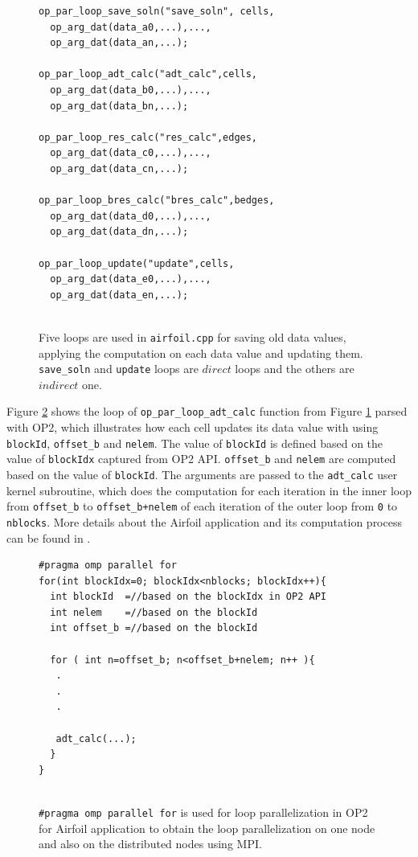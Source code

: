 \documentclass[conference]{IEEEtran}
\begin{document}
\begin{figure} [!h]
    \begin{lstlisting}
op_par_loop_save_soln("save_soln", cells,
  op_arg_dat(data_a0,...),...,
  op_arg_dat(data_an,...);
  
op_par_loop_adt_calc("adt_calc",cells,
  op_arg_dat(data_b0,...),...,
  op_arg_dat(data_bn,...);
  
op_par_loop_res_calc("res_calc",edges,
  op_arg_dat(data_c0,...),...,
  op_arg_dat(data_cn,...);

op_par_loop_bres_calc("bres_calc",bedges,
  op_arg_dat(data_d0,...),...,
  op_arg_dat(data_dn,...);
  
op_par_loop_update("update",cells,
  op_arg_dat(data_e0,...),...,
  op_arg_dat(data_en,...);
  
    \end{lstlisting}
    \caption{\small{Five loops are used in \texttt{airfoil.cpp} for saving old data values, applying the computation on each data value and updating them. \texttt{save\_soln} and \texttt{update} loops are $direct$ loops and the others are $indirect$ one.}}
    \label{l1}
\end{figure}


Figure \ref{l2} shows the loop of \texttt{op\_par\_loop\_adt\_calc} function from Figure \ref{l1} parsed with OP2, which illustrates how each cell updates its data value with using \texttt{blockId}, \texttt{offset\_b} and \texttt{nelem}. The value of \texttt{blockId} is defined based on the value of \texttt{blockIdx} captured from OP2 API.  \texttt{offset\_b} and \texttt{nelem} are computed based on the value of \texttt{blockId}. The arguments are passed to the \texttt{adt\_calc} user kernel subroutine, which does the computation for each iteration in the inner loop from \texttt{offset\_b} to \texttt{offset\_b+nelem} of each iteration of the outer loop from \texttt{0} to \texttt{nblocks}. More details about the Airfoil application and its computation process can be found in \cite{o8}.

\begin{figure} [!h]
    \begin{lstlisting}
#pragma omp parallel for
for(int blockIdx=0; blockIdx<nblocks; blockIdx++){
  int blockId  =//based on the blockIdx in OP2 API
  int nelem    =//based on the blockId 
  int offset_b =//based on the blockId
        
  for ( int n=offset_b; n<offset_b+nelem; n++ ){
   .
   .
   .

   adt_calc(...);
  }
}
  
    \end{lstlisting}
    \caption{\small{\texttt{\#pragma omp parallel for} is used for loop parallelization in OP2 for Airfoil application to obtain the loop parallelization on one node and also on the distributed nodes using MPI.}}
    \label{l2}
\end{figure}
\end{document}
